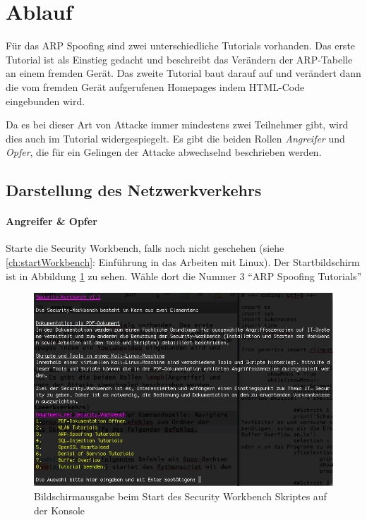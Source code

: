 \section{Ablauf}
Für das ARP Spoofing sind zwei unterschiedliche Tutorials vorhanden. Das erste Tutorial ist als Einstieg gedacht und beschreibt das Verändern der ARP-Tabelle an einem fremden Gerät. Das zweite Tutorial baut darauf auf und verändert dann die vom fremden Gerät aufgerufenen Homepages indem HTML-Code eingebunden wird.

Da es bei dieser Art von Attacke immer mindestens zwei Teilnehmer gibt, wird dies auch im Tutorial widergespiegelt. Es gibt die beiden Rollen \emph{Angreifer} und \emph{Opfer}, die für ein Gelingen der Attacke abwechselnd beschrieben werden.


\subsection{Darstellung des Netzwerkverkehrs}
\paragraph{Angreifer \& Opfer} Starte die Security Workbench, falls noch nicht geschehen (siehe \ref{ch:startWorkbench}: Einführung in das Arbeiten mit Linux). Der Startbildschirm ist in Abbildung \ref{fig:scriptstart} zu sehen. Wähle dort die Nummer 3 \enquote{ARP Spoofing Tutorials}

\begin{figure}
	\centering
	\includegraphics[width=\textwidth]{images/arp/Scriptstart}
	\caption{Bildschirmausgabe beim Start des Security Workbench Skriptes auf der Konsole}
	\label{fig:scriptstart}
\end{figure}


